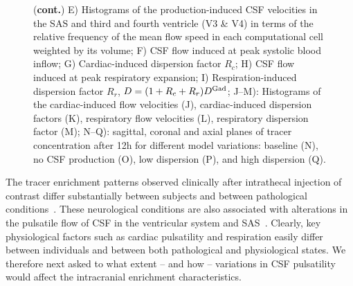 \documentclass[fleqn,10pt]{wlscirep}
\begin{document}
\begin{figure}
\ContinuedFloat
\caption{(\textbf{cont.})
E) Histograms of the production-induced CSF velocities in the SAS and third and fourth ventricle (V3 \& V4) in terms of the relative frequency of the mean flow speed in each computational cell weighted by its volume; 
F) CSF flow induced at peak systolic blood inflow; 
G) Cardiac-induced dispersion factor $R_c$;
H) CSF flow induced at peak respiratory expansion; 
I) Respiration-induced dispersion factor $R_r$, $D = (1 + R_c + R_r) D^{\rm Gad}$; J--M): Histograms of the cardiac-induced flow velocities (J),
cardiac-induced dispersion factors (K),
respiratory flow velocities (L), respiratory dispersion factor (M);
N--Q): sagittal, coronal and axial planes of tracer concentration after 12h for different model variations: baseline (N), no CSF production (O), low dispersion (P), and high dispersion (Q).
}
\end{figure}  

The tracer enrichment patterns observed clinically after intrathecal
injection of contrast differ substantially between subjects and
between pathological conditions~\cite{ringstad2018brain,
  eide2021direction, eide2021impaired, eide2022altered}. These
neurological conditions are also associated with alterations in the
pulsatile flow of CSF in the ventricular system and
SAS~\cite{eide2021direction}. Clearly, key physiological factors such
as cardiac pulsatility and respiration easily differ between
individuals and between both pathological and physiological states. We
therefore next asked to what extent -- and how -- variations in CSF
pulsatility would affect the intracranial enrichment characteristics.
\end{document}
